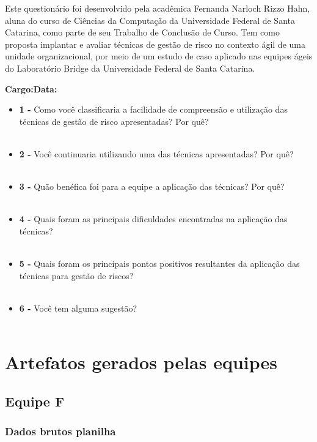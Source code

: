 \documentclass[
    12pt,       %
    openright,      %
    twoside,      %
    a4paper,      %
    english,      %
    french,       %
    spanish,      %
    brazil,       %
    ]{abntex2}
\begin{document}
\begin{apendicesenv}
 Este questionário foi desenvolvido pela acadêmica Fernanda Narloch Rizzo Hahn, aluna
do curso de Ciências da Computação da Universidade Federal de Santa Catarina, como
parte de seu Trabalho de Conclusão de Curso. Tem como proposta implantar e avaliar técnicas de gestão de risco no contexto ágil de uma unidade organizacional, por meio de um estudo de caso aplicado nas equipes ágeis do Laboratório Bridge da Universidade Federal de Santa Catarina.

\textbf{Cargo:}\hspace*{250pt}\textbf{Data:}

\begin{itemize} [label={}]
    \item \textbf{1 - } Como você classificaria a facilidade de compreensão e utilização das técnicas de gestão de risco apresentadas? Por quê? \\ \\
    \item \textbf{2 - } Você continuaria utilizando uma das técnicas apresentadas? Por quê? \\ \\
    \item \textbf{3 - } Quão benéfica foi para a equipe a aplicação das técnicas? Por quê? \\ \\
    \item \textbf{4 - } Quais foram as principais dificuldades encontradas na aplicação das técnicas? \\ \\
    \item \textbf{5 - } Quais foram os principais pontos positivos resultantes da aplicação das técnicas para gestão de riscos? \\ \\
    \item \textbf{6 - } Você tem alguma sugestão? \\ \\

\end{itemize}

 \chapter{Artefatos gerados pelas equipes}
 \label{sec:ApendiceC}
 \section{Equipe F}
\subsection{Dados brutos planilha}


\end{apendicesenv}
\end{document}
